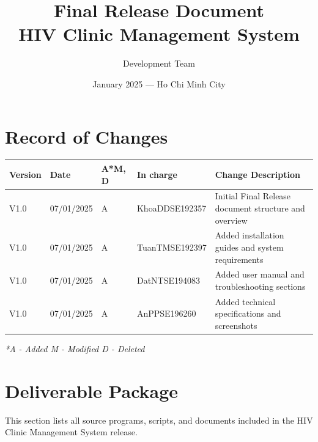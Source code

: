 \documentclass[12pt,a4paper]{article}
\title{%
    \vspace{-1cm}
    \textbf{Final Release Document\\HIV Clinic Management System}
}
\author{Development Team}
\date{January 2025 --- Ho Chi Minh City}
\begin{document}
\maketitle
\thispagestyle{empty}

\newpage

\section*{Record of Changes}

\begin{longtable}{@{}|p{2cm}|p{2cm}|p{1cm}|p{3cm}|p{6cm}|@{}}
\hline
\textbf{Version} & \textbf{Date} & \textbf{A*M, D} & \textbf{In charge} & \textbf{Change Description} \\
\hline
V1.0 & 07/01/2025 & A & KhoaDDSE192357 & Initial Final Release document structure and overview \\
\hline
V1.0 & 07/01/2025 & A & TuanTMSE192397 & Added installation guides and system requirements \\
\hline
V1.0 & 07/01/2025 & A & DatNTSE194083 & Added user manual and troubleshooting sections \\
\hline
V1.0 & 07/01/2025 & A & AnPPSE196260 & Added technical specifications and screenshots \\
\hline
\end{longtable}

\textit{*A - Added M - Modified D - Deleted}

\newpage

\tableofcontents

\newpage

\section{Deliverable Package}

This section lists all source programs, scripts, and documents included in the HIV Clinic Management System release.
\end{document}
